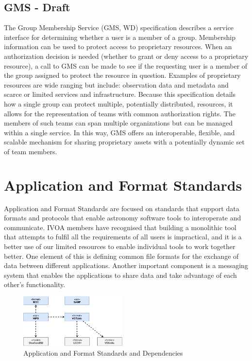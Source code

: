 \documentclass[11pt,a4paper]{ivoa}
\begin{document}
\subsection{GMS - Draft}

The Group Membership Service (GMS, WD) specification describes a service interface for determining 
whether a user is a member of a group. Membership information can be used to protect access to 
proprietary resources. When an authorization decision is needed (whether to grant or deny access 
to a proprietary resource), a call to GMS can be made to see if the requesting user is a member 
of the group assigned to protect the resource in question. Examples of proprietary resources are 
wide ranging but include: observation data and metadata and scarce or limited services and 
infrastructure. Because this specification details how a single group can protect multiple, 
potentially distributed, resources, it allows for the representation of teams with common 
authorization rights. The members of such teams can span multiple organizations but can be 
managed within a single service. In this way, GMS offers an interoperable, flexible, and 
scalable mechanism for sharing proprietary assets with a potentially dynamic set of team members. 

\section{Application and Format Standards}

Application and Format Standards are focused on standards that support data formats and 
protocols that enable astronomy software tools to interoperate and communicate. IVOA 
members have recognised that building a monolithic tool that attempts to fulfil all the 
requirements of all users is impractical, and it is a better use of our limited resources 
to enable individual tools to work together better. One element of this is defining 
common file formats for the exchange of data between different applications. Another 
important component is a messaging system that enables the applications to share data 
and take advantage of each other's functionality.

\begin{figure}[h]
\centering
\includegraphics[width=0.48\textwidth]{ivoa-arch-apps.pdf}
\caption{Application and Format Standards and Dependencies}
\label{fig:appsdeps}
\end{figure}
\end{document}
